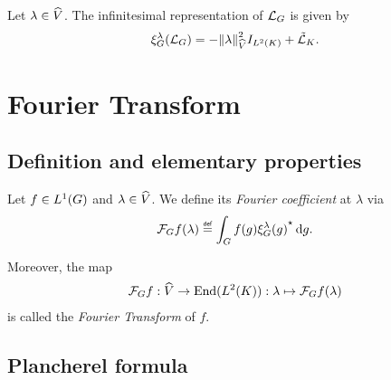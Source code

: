 \begin{corollary}
\label{corollary:infinitesimal_representation_of_the_Laplacian}
    Let $\lambda \in \dualGroup{\VectorSpace}$.
    The infinitesimal representation of $\Laplacian$ is given by
    \begin{align*}
        \Rep{\lambda}(\Laplacian) = - \norm[\dualGroup{\VectorSpace}]{\lambda}^2 \Id{\Lebesgue{2}{\CompactGroup}} + \RightLaplacian[\CompactGroup].
    \end{align*}
\end{corollary}

\section{Fourier Transform}

\subsection{Definition and elementary properties}

\begin{definition}
\label{definition:Fourier_Transform}
    Let $f \in \Lebesgue{1}{\Group}$ and $\lambda \in \dualGroup{\VectorSpace}$.
    We define its \emph{Fourier coefficient} at $\lambda$ via
    \begin{align*}
        \Fourier{f}(\lambda) \defeq \int_\Group f(g) \adj{\Rep{\lambda}(g)} \dd g.
    \end{align*}

    Moreover, the map
    \begin{align*}
        \Fourier{f} : \dualGroup{\VectorSpace} \to \End(\Lebesgue{2}{\CompactGroup}) :
        \lambda \mapsto \Fourier{f}(\lambda)
    \end{align*}
    is called the \emph{Fourier Transform} of $f$.
\end{definition}

\subsection{Plancherel formula}

